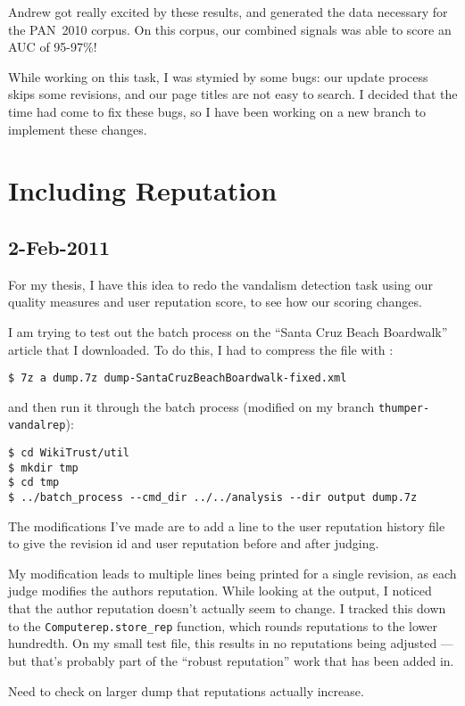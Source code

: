 Andrew got really excited by these results, and generated the data
necessary for the PAN~2010 corpus.
On this corpus, our combined signals was able to score an AUC of 95-97\%!

While working on this task, I was stymied by some \wikitrust bugs:
our update process skips some revisions, and our page titles are not
easy to search.
I decided that the time had come to fix these bugs, so I have been
working on a new branch to implement these changes.

\section{Including Reputation}

\subsection{2-Feb-2011}

For my thesis, I have this idea to redo the vandalism detection task
using our quality measures and user reputation score, to see how
our scoring changes.

I am trying to test out the batch process on the
``Santa Cruz Beach Boardwalk'' article that I downloaded.
To do this, I had to compress the file with :
\begin{verbatim}
$ 7z a dump.7z dump-SantaCruzBeachBoardwalk-fixed.xml
\end{verbatim}
and then run it through the batch process (modified on
my branch \texttt{thumper-vandalrep}):
\begin{verbatim}
$ cd WikiTrust/util
$ mkdir tmp
$ cd tmp
$ ../batch_process --cmd_dir ../../analysis --dir output dump.7z
\end{verbatim}
The modifications I've made are to add a line to the
user reputation history file to give the revision id
and user reputation before and after judging.

My modification leads to multiple lines being printed
for a single revision, as each judge modifies the authors reputation.
While looking at the output, I noticed that the author reputation
doesn't actually seem to change.
I tracked this down to the \texttt{Computerep.store\_rep}
function, which rounds reputations to the lower hundredth.
On my small test file, this results in no reputations being
adjusted --- but that's probably part of the ``robust reputation''
work that has been added in.

Need to check on larger dump that reputations actually increase.

